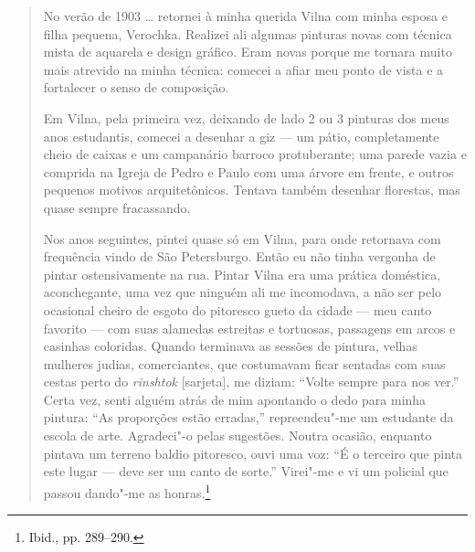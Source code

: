 \begin{quote}
No verão de 1903 \ldots{} retornei à minha querida Vilna com minha
esposa e filha pequena, Verochka. Realizei ali algumas pinturas novas
com técnica mista de aquarela e design gráfico. Eram novas porque me
tornara muito mais atrevido na minha técnica: comecei a afiar meu ponto
de vista e a fortalecer o senso de composição.

Em Vilna, pela primeira vez, deixando de lado 2 ou 3 pinturas dos meus
anos estudantis, comecei a desenhar a giz --- um pátio, completamente
cheio de caixas e um campanário barroco protuberante; uma parede vazia e
comprida na Igreja de Pedro e Paulo com uma árvore em frente, e outros
pequenos motivos arquitetônicos. Tentava também desenhar florestas, mas
quase sempre fracassando.

Nos anos seguintes, pintei quase só em Vilna, para onde retornava com
frequência vindo de São Petersburgo. Então eu não tinha vergonha de
pintar ostensivamente na rua. Pintar Vilna era uma prática doméstica,
aconchegante, uma vez que ninguém ali me incomodava, a não ser pelo
ocasional cheiro de esgoto do pitoresco gueto da cidade --- meu canto
favorito --- com suas alamedas estreitas e tortuosas, passagens em arcos e
casinhas coloridas. Quando terminava as sessões de pintura, velhas
mulheres judias, comerciantes, que costumavam ficar sentadas com suas
cestas perto do \textit{rinshtok} {[}sarjeta{]}, me diziam: ``Volte sempre
para nos ver.'' Certa vez, senti alguém atrás de mim apontando o dedo
para minha pintura: ``As proporções estão erradas,'' repreendeu"-me um
estudante da escola de arte. Agradeci"-o pelas sugestões. Noutra ocasião,
enquanto pintava um terreno baldio pitoresco, ouvi uma voz: ``É o
terceiro que pinta este lugar --- deve ser um canto de sorte.'' Virei"-me e
vi um policial que passou dando"-me as honras.\footnote{Ibid., pp. 289--290.} 
\end{quote}

